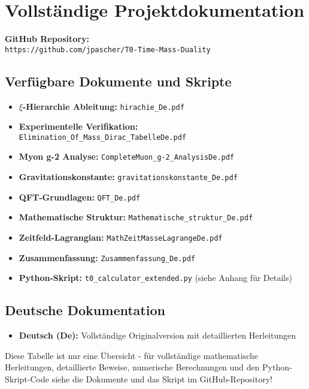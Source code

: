 \documentclass[12pt,a4paper]{article}
\begin{document}
	\section{Vollständige Projektdokumentation}
	
	\textbf{GitHub Repository:}\\
	\texttt{https://github.com/jpascher/T0-Time-Mass-Duality}
	
	\subsection{Verfügbare Dokumente und Skripte}
	
	\begin{itemize}
		\item \textbf{\(\xi\)-Hierarchie Ableitung:} \texttt{hirachie\_De.pdf}
		\item \textbf{Experimentelle Verifikation:} \texttt{Elimination\_Of\_Mass\_Dirac\_TabelleDe.pdf}
		\item \textbf{Myon g-2 Analyse:} \texttt{CompleteMuon\_g-2\_AnalysisDe.pdf}
		\item \textbf{Gravitationskonstante:} \texttt{gravitationskonstante\_De.pdf}
		\item \textbf{QFT-Grundlagen:} \texttt{QFT\_De.pdf}
		\item \textbf{Mathematische Struktur:} \texttt{Mathematische\_struktur\_De.pdf}
		\item \textbf{Zeitfeld-Lagrangian:} \texttt{MathZeitMasseLagrangeDe.pdf}
		\item \textbf{Zusammenfassung:} \texttt{Zusammenfassung\_De.pdf}
		\item \textbf{Python-Skript:} \texttt{t0\_calculator\_extended.py} (siehe Anhang für Details)
	\end{itemize}
	
	\subsection{Deutsche Dokumentation}
	
	\begin{itemize}
		\item \textbf{Deutsch (De):} Vollständige Originalversion mit detaillierten Herleitungen
	\end{itemize}
	
	Diese Tabelle ist nur eine Übersicht - für vollständige mathematische Herleitungen, detaillierte Beweise, numerische Berechnungen und den Python-Skript-Code siehe die Dokumente und das Skript im GitHub-Repository!
	
\end{document}
